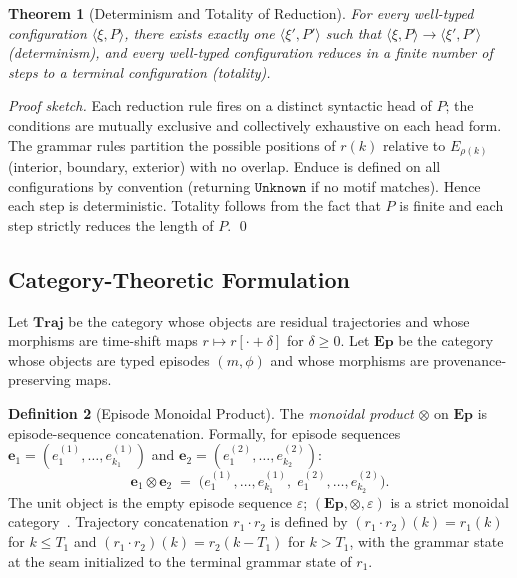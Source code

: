 \documentclass[11pt,a4paper]{article}
\theoremstyle{plain}
\newtheorem{theorem}{Theorem}[section]
\theoremstyle{definition}
\newtheorem{definition}[theorem]{Definition}
\theoremstyle{remark}
\newcommand{\Traj}{\mathbf{Traj}}
\newcommand{\Ep}{\mathbf{Ep}}
\begin{document}
\begin{theorem}[Determinism and Totality of Reduction]
\label{thm:det_total}
  For every well-typed configuration $\langle \xi, P \rangle$, there exists exactly one
  $\langle \xi', P' \rangle$ such that $\langle \xi, P \rangle \to \langle \xi', P' \rangle$
  (determinism), and every well-typed configuration reduces in a finite number of steps to a
  terminal configuration (totality).
\end{theorem}
\begin{proof}[Proof sketch]
  Each reduction rule fires on a distinct syntactic head of $P$; the conditions are mutually
  exclusive and collectively exhaustive on each head form. The grammar rules partition the
  possible positions of $r(k)$ relative to $E_{\rho(k)}$ (interior, boundary, exterior) with no
  overlap. Enduce is defined on all configurations by convention (returning $\mathtt{Unknown}$ if
  no motif matches). Hence each step is deterministic. Totality follows from the fact that $P$
  is finite and each step strictly reduces the length of $P$. \qed
\end{proof}

\subsection{Category-Theoretic Formulation}
\label{sec:category}

Let $\Traj$ be the category whose objects are residual trajectories and whose morphisms are
time-shift maps $r \mapsto r[\cdot + \delta]$ for $\delta \geq 0$. Let $\Ep$ be the category
whose objects are typed episodes $(m, \phi)$ and whose morphisms are provenance-preserving maps.

\begin{definition}[Episode Monoidal Product]
\label{def:monoidal}
  The \emph{monoidal product} $\otimes$ on $\Ep$ is episode-sequence concatenation. Formally,
  for episode sequences $\mathbf{e}_1 = (e_1^{(1)}, \ldots, e_{k_1}^{(1)})$ and
  $\mathbf{e}_2 = (e_1^{(2)}, \ldots, e_{k_2}^{(2)})$:
  \begin{equation}
    \mathbf{e}_1 \otimes \mathbf{e}_2 \;=\; \bigl(e_1^{(1)}, \ldots, e_{k_1}^{(1)},\;
      e_1^{(2)}, \ldots, e_{k_2}^{(2)}\bigr).
  \end{equation}
  The unit object is the empty episode sequence $\varepsilon$; $(\Ep, \otimes, \varepsilon)$ is
  a strict monoidal category~\cite{mac_lane}. Trajectory concatenation $r_1 \cdot r_2$ is
  defined by $(r_1 \cdot r_2)(k) = r_1(k)$ for $k \leq T_1$ and $(r_1 \cdot r_2)(k) = r_2(k-T_1)$
  for $k > T_1$, with the grammar state at the seam initialized to the terminal grammar state
  of $r_1$.
\end{definition}
\end{document}
